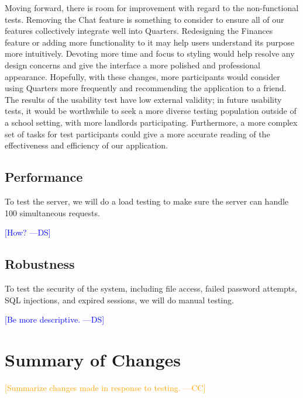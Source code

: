 \documentclass[12pt]{article}
\newcommand{\authornote}[3]{\textcolor{#1}{[#3 ---#2]}}
\newcommand{\authornote}[3]{}
\newcommand{\ds}[1]{\authornote{blue}{DS}{#1}}
\newcommand{\cc}[1]{\authornote{orange}{CC}{#1}}
\begin{document}
Moving forward, there is room for improvement with regard to the non-functional tests. Removing the Chat feature is something to consider to ensure all of our features collectively integrate well into Quarters. Redesigning the Finances feature or adding more functionality to it may help users understand its purpose more intuitively. Devoting more time and focus to styling would help resolve any design concerns and give the interface a more polished and professional appearance. Hopefully, with these changes, more participants would consider using Quarters more frequently and recommending the application to a friend. The results of the usability test have low external validity; in future usability tests, it would be worthwhile to seek a more diverse testing population outside of a school setting, with more landlords participating. Furthermore, a more complex set of tasks for test participants could give a more accurate reading of the effectiveness and efficiency of our application.
 



\subsection{Performance}
To test the server, we will do a load testing to make sure the server can handle 100 simultaneous requests.

\ds{How?}

\subsection{Robustness}
To test the security of the system, including file access, failed password attempts, SQL injections, and expired sessions, we will do manual testing.

\ds{Be more descriptive.}

\section{Summary of Changes}
\cc{Summarize changes made in response to testing.}
\end{document}
